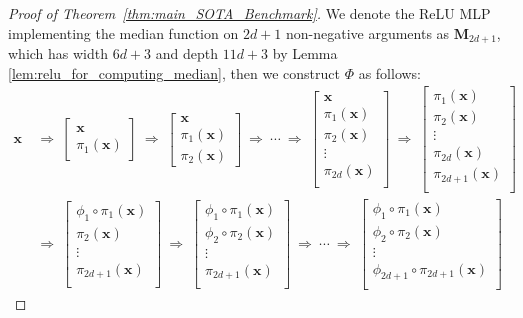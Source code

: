 \documentclass{article}
\numberwithin{equation}{section}
\theoremstyle{definition}
\begin{document}
\begin{proof}[{Proof of Theorem~\ref{thm:main_SOTA_Benchmark}}]
We denote the ReLU MLP implementing the median function on $2d+1$ non-negative arguments as $\mathbf{M}_{2d+1}$, which has width $6d+3$ and depth $11d+3$ by Lemma \ref{lem:relu_for_computing_median}, then we construct $\Phi$ as follows:
\begin{align*}
\mathbf{x}
\ &\Longrightarrow \
\begin{bmatrix} \mathbf{x} \\ \pi_1(\mathbf{x}) \end{bmatrix}
\ \Longrightarrow \
\begin{bmatrix} \mathbf{x} \\ \pi_1(\mathbf{x}) \\ \pi_2(\mathbf{x}) \end{bmatrix}
\ \Longrightarrow \
\cdots
\ \Longrightarrow \
\begin{bmatrix} \mathbf{x} \\ \pi_1(\mathbf{x}) \\ \pi_2(\mathbf{x}) \\ \vdots \\ \pi_{2d}(\mathbf{x}) \\ \end{bmatrix}
\ \Longrightarrow \
\begin{bmatrix} \pi_1(\mathbf{x}) \\ \pi_2(\mathbf{x}) \\ \vdots \\ \pi_{2d}(\mathbf{x}) \\ \pi_{2d+1}(\mathbf{x}) \\ \end{bmatrix} 
\\
\ &\Longrightarrow \
\begin{bmatrix}  \phi_1\circ\pi_1(\mathbf{x}) \\ \pi_2(\mathbf{x}) \\ \vdots \\ \pi_{2d+1}(\mathbf{x}) \\ \end{bmatrix}
\ \Longrightarrow \
\begin{bmatrix}  \phi_1\circ\pi_1(\mathbf{x}) \\ \phi_2\circ\pi_2(\mathbf{x}) \\ \vdots \\ \pi_{2d+1}(\mathbf{x}) \\ \end{bmatrix}
\ \Longrightarrow \
\cdots
\ \Longrightarrow \
\begin{bmatrix}  \phi_1\circ\pi_1(\mathbf{x}) \\ \phi_2\circ\pi_2(\mathbf{x}) \\ \vdots \\ \phi_{2d+1}\circ\pi_{2d+1}(\mathbf{x}) \\ \end{bmatrix}\

\end{align*}
\end{proof}
\end{document}
